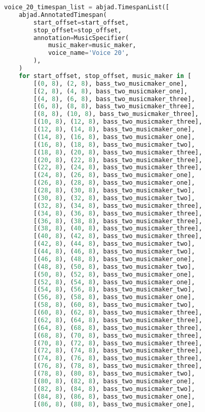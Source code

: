 \begin{lstlisting}[language=Python, caption=Invocation Source Code]
voice_20_timespan_list = abjad.TimespanList([
    abjad.AnnotatedTimespan(
        start_offset=start_offset,
        stop_offset=stop_offset,
        annotation=MusicSpecifier(
            music_maker=music_maker,
            voice_name='Voice 20',
        ),
    )
    for start_offset, stop_offset, music_maker in [
        [(0, 8), (2, 8), bass_two_musicmaker_one],
        [(2, 8), (4, 8), bass_two_musicmaker_one],
        [(4, 8), (6, 8), bass_two_musicmaker_three],
        [(6, 8), (8, 8), bass_two_musicmaker_three],
        [(8, 8), (10, 8), bass_two_musicmaker_three],
        [(10, 8), (12, 8), bass_two_musicmaker_three],
        [(12, 8), (14, 8), bass_two_musicmaker_one],
        [(14, 8), (16, 8), bass_two_musicmaker_one],
        [(16, 8), (18, 8), bass_two_musicmaker_two],
        [(18, 8), (20, 8), bass_two_musicmaker_three],
        [(20, 8), (22, 8), bass_two_musicmaker_three],
        [(22, 8), (24, 8), bass_two_musicmaker_three],
        [(24, 8), (26, 8), bass_two_musicmaker_one],
        [(26, 8), (28, 8), bass_two_musicmaker_one],
        [(28, 8), (30, 8), bass_two_musicmaker_two],
        [(30, 8), (32, 8), bass_two_musicmaker_two],
        [(32, 8), (34, 8), bass_two_musicmaker_three],
        [(34, 8), (36, 8), bass_two_musicmaker_three],
        [(36, 8), (38, 8), bass_two_musicmaker_three],
        [(38, 8), (40, 8), bass_two_musicmaker_three],
        [(40, 8), (42, 8), bass_two_musicmaker_three],
        [(42, 8), (44, 8), bass_two_musicmaker_two],
        [(44, 8), (46, 8), bass_two_musicmaker_two],
        [(46, 8), (48, 8), bass_two_musicmaker_one],
        [(48, 8), (50, 8), bass_two_musicmaker_two],
        [(50, 8), (52, 8), bass_two_musicmaker_one],
        [(52, 8), (54, 8), bass_two_musicmaker_one],
        [(54, 8), (56, 8), bass_two_musicmaker_two],
        [(56, 8), (58, 8), bass_two_musicmaker_one],
        [(58, 8), (60, 8), bass_two_musicmaker_two],
        [(60, 8), (62, 8), bass_two_musicmaker_three],
        [(62, 8), (64, 8), bass_two_musicmaker_three],
        [(64, 8), (68, 8), bass_two_musicmaker_three],
        [(68, 8), (70, 8), bass_two_musicmaker_three],
        [(70, 8), (72, 8), bass_two_musicmaker_three],
        [(72, 8), (74, 8), bass_two_musicmaker_three],
        [(74, 8), (76, 8), bass_two_musicmaker_three],
        [(76, 8), (78, 8), bass_two_musicmaker_three],
        [(78, 8), (80, 8), bass_two_musicmaker_two],
        [(80, 8), (82, 8), bass_two_musicmaker_one],
        [(82, 8), (84, 8), bass_two_musicmaker_two],
        [(84, 8), (86, 8), bass_two_musicmaker_one],
        [(86, 8), (88, 8), bass_two_musicmaker_one],

\end{lstlisting}
